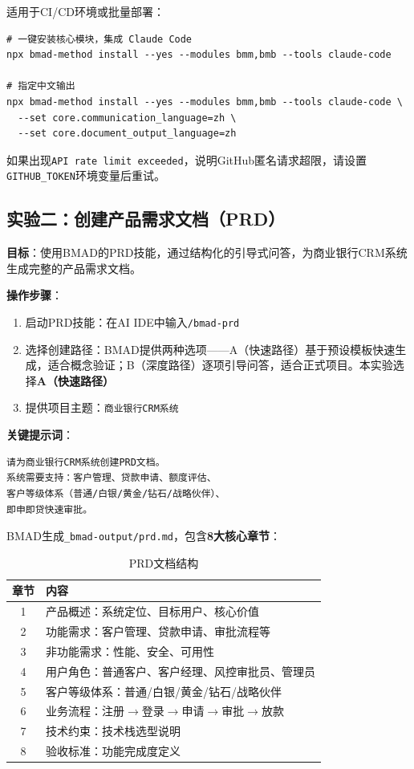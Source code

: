 适用于CI/CD环境或批量部署：

\begin{lstlisting}[style=shell]
# 一键安装核心模块，集成 Claude Code
npx bmad-method install --yes --modules bmm,bmb --tools claude-code

# 指定中文输出
npx bmad-method install --yes --modules bmm,bmb --tools claude-code \
  --set core.communication_language=zh \
  --set core.document_output_language=zh
\end{lstlisting}

\begin{notebox}[故障排查]
如果出现\texttt{API rate limit exceeded}，说明GitHub匿名请求超限，请设置\texttt{GITHUB\_TOKEN}环境变量后重试。
\end{notebox}

\subsection{实验二：创建产品需求文档（PRD）}

\textbf{目标}：使用BMAD的PRD技能，通过结构化的引导式问答，为商业银行CRM系统生成完整的产品需求文档。

\textbf{操作步骤}：

\begin{enumerate}[leftmargin=2em]
  \item 启动PRD技能：在AI IDE中输入\texttt{/bmad-prd}
  \item 选择创建路径：BMAD提供两种选项——A（快速路径）基于预设模板快速生成，适合概念验证；B（深度路径）逐项引导问答，适合正式项目。本实验选择\textbf{A（快速路径）}
  \item 提供项目主题：\texttt{商业银行CRM系统}
\end{enumerate}

\textbf{关键提示词}：

\begin{lstlisting}
请为商业银行CRM系统创建PRD文档。
系统需要支持：客户管理、贷款申请、额度评估、
客户等级体系（普通/白银/黄金/钻石/战略伙伴）、
即申即贷快速审批。
\end{lstlisting}

BMAD生成\texttt{\_bmad-output/prd.md}，包含\textbf{8大核心章节}：

\begin{table}[H]
\centering
\begin{tabular}{cl}
\toprule
\textbf{章节} & \textbf{内容} \\
\midrule
1 & 产品概述：系统定位、目标用户、核心价值 \\
2 & 功能需求：客户管理、贷款申请、审批流程等 \\
3 & 非功能需求：性能、安全、可用性 \\
4 & 用户角色：普通客户、客户经理、风控审批员、管理员 \\
5 & 客户等级体系：普通/白银/黄金/钻石/战略伙伴 \\
6 & 业务流程：注册$\to$登录$\to$申请$\to$审批$\to$放款 \\
7 & 技术约束：技术栈选型说明 \\
8 & 验收标准：功能完成度定义 \\
\bottomrule
\end{tabular}
\caption{PRD文档结构}
\end{table}

